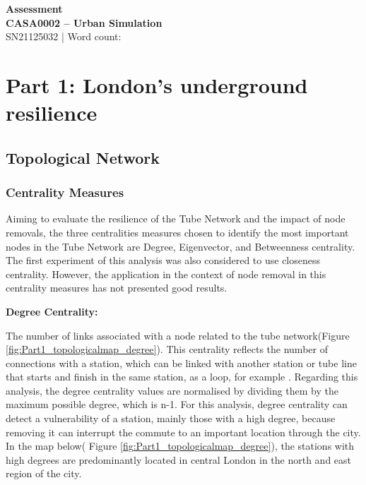 \documentclass[10pt]{report}
\author{Felipe Santos Almeida}
\numberwithin{figure}{section}
\numberwithin{table}{section}
\begin{document}

\begin{center}
    \vspace*{-3cm}
\end{center}   
    {\LARGE\textbf{Assessment\\
    CASA0002 – Urban Simulation\\}}
SN21125032 | Word count: 

\vspace{5mm} %
  
\section{Part 1: London’s underground resilience}


 \subsection{Topological Network}
\subsubsection{Centrality Measures } 
        
         Aiming to evaluate the resilience of the Tube Network and the impact of node removals, the three centralities measures chosen to identify the most important nodes in the Tube Network are Degree, Eigenvector, and Betweenness centrality. The first experiment of this analysis was also considered to use closeness centrality. However, the application in the context of node removal in this centrality measures has not presented good results.  
        
        \vspace{5mm} %
        
        \textbf{Degree Centrality:} 
        
The number of links associated with a node related to the tube network(Figure \ref{fig:Part1_topologicalmap_degree}). This centrality reflects the number of connections with a station, which can be linked with another station or tube line that starts and finish in the same station, as a loop, for example \cite{arcaute_review_2022}. Regarding this analysis, the degree centrality values are normalised by dividing them by the maximum possible degree, which is n-1. For this analysis, degree centrality can detect a vulnerability of a station, mainly those with a high degree, because removing it can interrupt the commute to an important location through the city.  In the map below( Figure \ref{fig:Part1_topologicalmap_degree}), the stations with high degrees are predominantly located in central London in the north and east region of the city.
\end{document}
